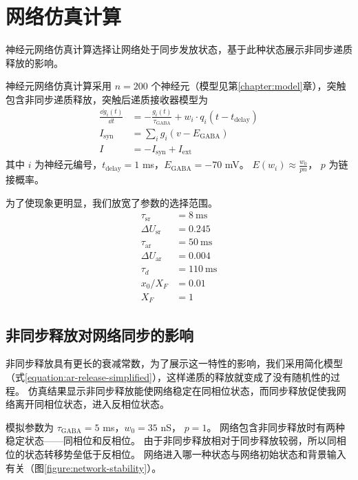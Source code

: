\section{网络仿真计算}
\label{section:resutl:network}
神经元网络仿真计算选择让网络处于同步发放状态，基于此种状态展示非同步递质释放的影响。

神经元网络仿真计算采用 $n = 200$ 个神经元（模型见第\ref{chapter:model}章），突触包含非同步递质释放，突触后递质接收器模型为
\begin{align}
\label{equation:network-receptor-model}
\frac{\dd{g_i\left(t\right)}}{\dd{t}} &= - \frac{g_i\left(t\right)}{\tau_\text{GABA}} + w_i \cdot q_i\left(t - t_\text{delay}\right) \\
I_\text{syn} &= \sum_i g_i\left(v-E_\text{GABA}\right) \\
I &= - I_\text{syn} + I_\text{ext}
\end{align}
其中 $i$ 为神经元编号，$t_\text{delay} = 1$ ms，$E_\text{GABA} = -70$ mV。
$E(w_i) \approx \frac{w_0}{pn}$， $p$ 为链接概率。

为了使现象更明显，我们放宽了参数的选择范围。
\begin{align}
\label{equation:network-parameters}
\tau_\text{sr} &=  8 \ \text{ms} \\
\Delta U_\text{sr} &= 0.245 \\
\tau_\text{ar} &= 50 \ \text{ms} \\
\Delta U_\text{ar} &= 0.004 \\
\tau_d &= 110 \ \text{ms} \\
x_0/X_F &= 0.01 \\
X_F &= 1
\end{align}


\subsection{非同步释放对网络同步的影响}
\label{section:result:network-synchronization}
非同步释放具有更长的衰减常数，为了展示这一特性的影响，我们采用简化模型（式\ref{equation:ar-release-simplified}），这样递质的释放就变成了没有随机性的过程。
仿真结果显示非同步释放能使网络稳定在同相位状态，而同步释放促使我网络离开同相位状态，进入反相位状态。

模拟参数为 $\tau_\text{GABA} = 5$ ms，$w_0 = 35$ nS， $p = 1$。
网络包含非同步释放时有两种稳定状态——同相位和反相位。
由于非同步释放相对于同步释放较弱，所以同相位的状态转移势垒低于反相位。
网络进入哪一种状态与网络初始状态和背景输入有关（图\ref{figure:network-stability}）。

